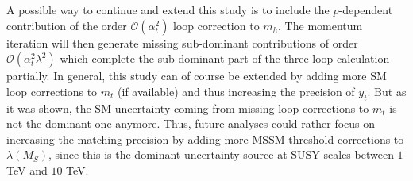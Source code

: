 \documentclass[a4paper,12pt]{book}
\begin{document}
A possible way to continue and extend this study is to include the $p$-dependent contribution of the order $\mathcal{O}(\alpha_t^2)$ loop correction to $m_h$. The momentum iteration will then generate missing sub-dominant contributions of order $\mathcal{O}(\alpha_t^2\lambda^2)$ which complete the sub-dominant part of the three-loop calculation partially. In general, this study can of course be extended by adding more SM loop corrections to $m_t$ (if available) and thus increasing the precision of $y_t$.  But as it was shown, the SM uncertainty coming from missing loop corrections to $m_t$ is not the dominant one anymore. Thus, future analyses could rather focus on increasing the matching precision by adding more MSSM threshold corrections to $\lambda(M_S)$, since this is the dominant uncertainty source at SUSY scales between $1$ TeV and $10$ TeV. 
\clearpage
\end{document}
